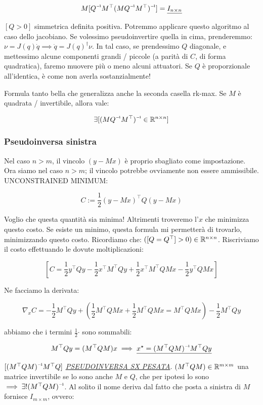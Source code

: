 \[
	M[\inv{Q}M^\top\inv{(M\inv{Q}M^\top)}] = \underline{I_{n\times n}}
\]

$[Q>0]$ simmetrica definita positiva. Potremmo applicare questo algoritmo al caso dello jacobiano. Se volessimo pseudoinvertire quella in cima, prenderemmo: $\nu=J(q)\dot{q}\implies \dot{q}=J(q)^\dag \nu$. In tal caso, se prendessimo $Q$ diagonale, e mettessimo alcune componenti grandi / piccole (a parità di $C$, di forma quadratica), faremo muovere più o meno alcuni attuatori. Se $Q$ è proporzionale all'identica, è come non averla sostanzialmente!

Formula tanto bella che generalizza anche la seconda casella rk-max. Se $M$ è quadrata / invertibile, allora vale:

\[	
	\exists[\inv{(M\inv{Q}M^\top)}\in\R^{n\times n}]
\]

\subsubsection{Pseudoinversa sinistra}

Nel caso $n>m$, il vincolo $(y-Mx)$ è proprio sbagliato come impostazione. Ora siamo nel caso $n>m$; il vincolo potrebbe ovviamente non essere ammissibile. UNCONSTRAINED MINIMUM:

\[
	C := \frac{1}{2}(y-Mx)^\top Q (y-Mx)
\]

Voglio che questa quantità sia minima! Altrimenti troveremo l'$x$ che minimizza questo costo. Se esiste un minimo, questa formula mi permetterà di trovarlo, minimizzando questo costo. Ricordiamo che: $([Q=Q^\top]>0)\in\mathbb{R}^{n\times n}$. Riscriviamo il costo effettuando le dovute moltiplicazioni:

\[
	[C = \frac{1}{2}y^\top Qy - \frac{1}{2}x^\top M^\top Qy + \frac{1}{2}x^\top M^\top QMx - \frac{1}{2}y^\top QMx]
\]

Ne facciamo la derivata:

\[
	\nabla_x{C} = -\frac{1}{2}M^\top Qy + (\frac{1}{2}M^\top QMx + \frac{1}{2}M^\top QMx = M^\top QMx) - \frac{1}{2}M^\top Qy
\]

abbiamo che i termini $\frac{1}{2}\mathord{\cdot}$ sono sommabili:

\[
	M^\top Qy = (M^\top QM)x \implies \underline{x^\star=\inv{(M^\top QM)}M^\top Qy}
\]

$[\inv{(M^\top QM)}M^\top Q]$ \textit{\underline{\underline{PSEUDOINVERSA SX} PESATA}}. $(M^\top QM)\in\mathbb{R}^{m\times m}$ una matrice invertibile se lo sono anche $M$ e $Q$, che per ipotesi lo sono $\implies \exists! \inv{(M^\top QM)}$. Al solito il nome deriva dal fatto che posta a sinistra di $M$ fornisce $I_{m\times m}$, ovvero:

